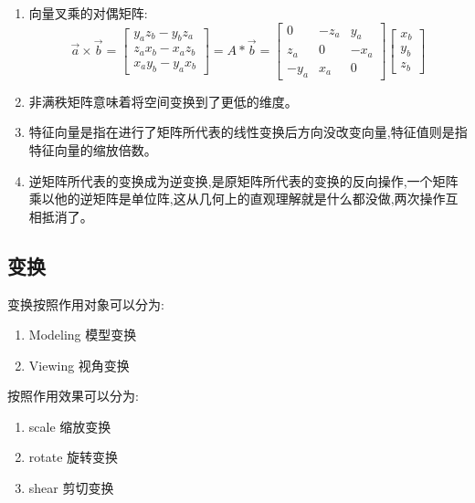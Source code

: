 \documentclass[UTF8]{ctexbook}
\begin{document}
{{{      \begin{enumerate}
        \item {向量叉乘的对偶矩阵:
              $$\vec{a} \times \vec{b}
                =
                \left[\begin{matrix}
                    y_az_b - y_bz_a \\
                    z_ax_b - x_az_b \\
                    x_ay_b - y_ax_b
                  \end{matrix}\right]
                =
                A * \vec{b}
                =
                \left[\begin{matrix}
                    0    & -z_a & y_a  \\
                    z_a  & 0    & -x_a \\
                    -y_a & x_a  & 0
                  \end{matrix}\right]
                \left[\begin{array}{c}
                    x_b \\
                    y_b \\
                    z_b
                  \end{array}
                  \right]
              $$
              }
        \item 非满秩矩阵意味着将空间变换到了更低的维度。
        \item 特征向量是指在进行了矩阵所代表的线性变换后方向没改变向量,特征值则是指特征向量的缩放倍数。
        \item 逆矩阵所代表的变换成为逆变换,是原矩阵所代表的变换的反向操作,一个矩阵乘以他的逆矩阵是单位阵,这从几何上的直观理解就是什么都没做,两次操作互相抵消了。
      \end{enumerate}
    }

    \subsection{变换}{
      变换按照作用对象可以分为:
      \begin{enumerate}
        \item Modeling 模型变换
        \item Viewing 视角变换
      \end{enumerate}

      按照作用效果可以分为:
      \begin{enumerate}
        \item scale 缩放变换
        \item rotate 旋转变换
        \item shear 剪切变换
      \end{enumerate}

}}}
\end{document}
